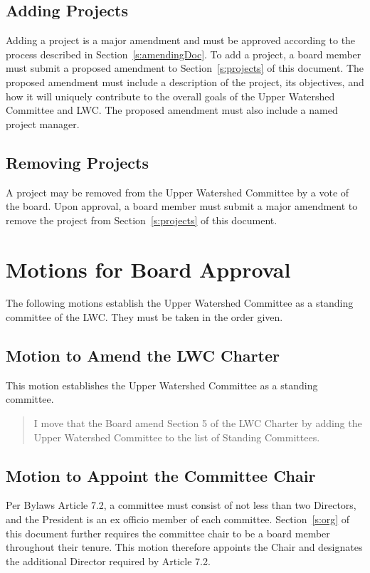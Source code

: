 \documentclass[letterpaper,11pt,leqno]{article}
\begin{document}
\subsection{Adding Projects}
Adding a project is a major amendment and must be approved according to the process described in Section~\ref{s:amendingDoc}.
To add a project, a board member must submit a proposed amendment to Section~\ref{s:projects} of this document.
The proposed amendment must include a description of the project, its objectives, and how it will uniquely contribute to the overall goals of the Upper Watershed Committee and LWC.
The proposed amendment must also include a named project manager.

\subsection{Removing Projects}
A project may be removed from the Upper Watershed Committee by a vote of the board. Upon approval, a board member must submit a major amendment to remove the project from Section~\ref{s:projects} of this document.

\appendix
\section{Motions for Board Approval}\label{a:motions}

The following motions establish the Upper Watershed Committee as a standing committee of the LWC. They must be taken in the order given.

\subsection{Motion to Amend the LWC Charter}\label{a:motionCharter}

This motion establishes the Upper Watershed Committee as a standing committee.

\begin{quote}
I move that the Board amend Section 5 of the LWC Charter by adding the Upper Watershed Committee to the list of Standing Committees.
\end{quote}

\subsection{Motion to Appoint the Committee Chair}\label{a:motionChair}

Per Bylaws Article 7.2, a committee must consist of not less than two Directors, and the President is an ex officio member of each committee. Section~\ref{s:org} of this document further requires the committee chair to be a board member throughout their tenure. This motion therefore appoints the Chair and designates the additional Director required by Article 7.2.
\end{document}
